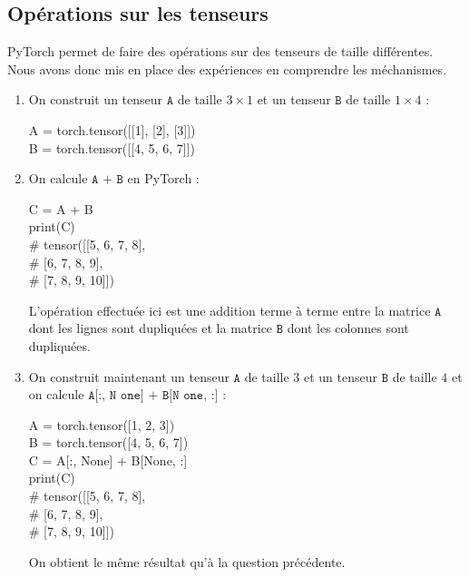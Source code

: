 \documentclass[12pt,a4paper]{article}
\newcommand{\code}[1]{%
    \begin{tcolorbox}[colback=black!10!white,colframe=black]
        #1
    \end{tcolorbox}
}
\begin{document}
\subsection{Opérations sur les tenseurs}
PyTorch permet de faire des opérations sur des tenseurs de taille différentes.
Nous avons donc mis en place des expériences en comprendre les méchanismes.

\begin{enumerate}
    \item On construit un tenseur $\texttt{A}$ de taille $3 \times 1$ et un tenseur $\texttt{B}$ de taille $1 \times 4$ :
    
    \code{
        A = torch.tensor([[1], [2], [3]])\\
        B = torch.tensor([[4, 5, 6, 7]])
    }

\newpage

    \item On calcule $\texttt{A + B}$ en PyTorch :
    
    \code{
        C = A + B\\
        print(C)\\
        \# tensor([[5, 6, 7, 8],\\
        \#         [6, 7, 8, 9],\\
        \#         [7, 8, 9, 10]])
    }

    L'opération effectuée ici est une addition terme à terme entre la matrice $\texttt{A}$ dont les lignes sont dupliquées et la matrice $\texttt{B}$ dont les colonnes sont dupliquées.
    
    \item On construit maintenant un tenseur $\texttt{A}$ de taille $3$ et un tenseur $\texttt{B}$ de taille $4$ et on calcule $\texttt{A[:, N one] + B[N one, :]}$ :
    
    \code{
        A = torch.tensor([1, 2, 3])\\
        B = torch.tensor([4, 5, 6, 7])\\
        C = A[:, None] + B[None, :]\\
        print(C)\\
        \# tensor([[5, 6, 7, 8],\\
        \#         [6, 7, 8, 9],\\
        \#         [7, 8, 9, 10]])
    }

    On obtient le même résultat qu'à la question précédente.

\end{enumerate}
\end{document}
